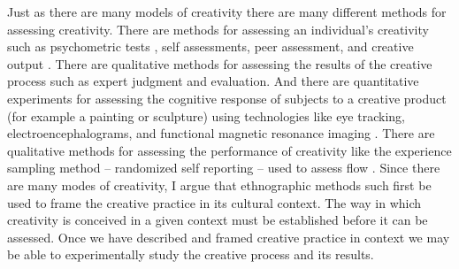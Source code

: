 \documentclass{article}
\begin{document}
Just as there are many models of creativity
there are many different methods for assessing creativity. 
%
There are methods for assessing an individual's creativity 
such as psychometric tests \citep{Drago2014}, 
self assessments, peer assessment, and creative output \cite{Csikszentmihalyi2014}. 
%
There are qualitative methods for assessing the results of the creative process 
such as expert judgment and evaluation. 
And there are quantitative experiments for assessing the cognitive response of subjects to a creative product 
(for example a painting or sculpture) 
using technologies like eye tracking, electroencephalograms, and functional magnetic resonance imaging
\cite{Chatterjee2014}.
%
There are qualitative methods for assessing the performance of creativity like
the experience sampling method -- randomized self reporting -- used to assess flow \cite{Csikszentmihalyi2014a}.
%
Since there are many modes of creativity, 
I argue that ethnographic methods such first be used to frame the creative practice
in its cultural context. 
The way in which creativity is conceived in a given context must be established before it can be assessed.
%
Once we have described and framed creative practice in context
we may be able to experimentally study the creative process and its results. 









 
\end{document}
